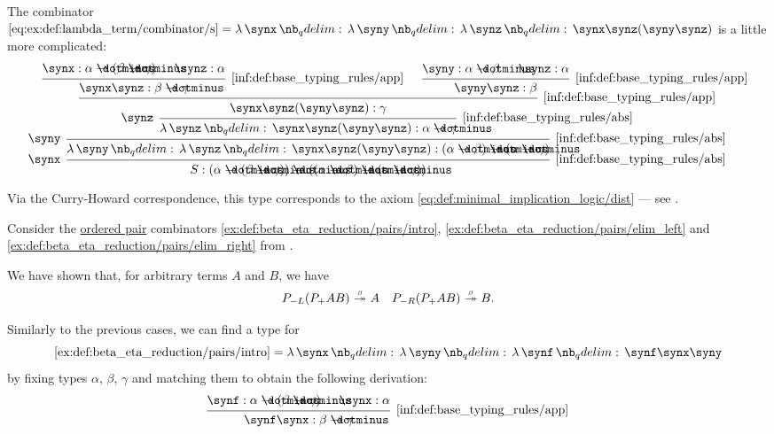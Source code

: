 \begin{example}
\begin{thmenum}
     The combinator \( \ref{eq:ex:def:lambda_term/combinator/s} = \qabs \synx \qabs \syny \qabs \synz \synx \synz (\syny \synz) \) is a little more complicated:
    \begin{equation*}
      \begin{prooftree}
        \hypo{ \synx: \alpha \synimplies (\beta \synimplies \gamma) }
        \hypo{ \synz: \alpha }
        \infer2[\ref{inf:def:base_typing_rules/app}]{ \synx \synz: \beta \synimplies \gamma }

        \hypo{ \syny: \alpha \synimplies \beta }
        \hypo{ \synz: \alpha }
        \infer2[\ref{inf:def:base_typing_rules/app}]{ \syny \synz: \beta }

        \infer2[\ref{inf:def:base_typing_rules/app}]{ \synx \synz (\syny \synz): \gamma }
        \infer[left label=\( \synz \)]1[\ref{inf:def:base_typing_rules/abs}]{ \qabs \synz \synx \synz (\syny \synz): \alpha \synimplies \gamma }
        \infer[left label=\( \syny \)]1[\ref{inf:def:base_typing_rules/abs}]{ \qabs \syny \qabs \synz \synx \synz (\syny \synz): (\alpha \synimplies \beta) \synimplies (\alpha \synimplies \gamma) }
        \infer[left label=\( \synx \)]1[\ref{inf:def:base_typing_rules/abs}]{ S: (\alpha \synimplies (\beta \synimplies \gamma)) \synimplies ((\alpha \synimplies \beta) \synimplies (\alpha \synimplies \gamma)) }
      \end{prooftree}
    \end{equation*}

    Via the Curry-Howard correspondence, this type corresponds to the axiom \eqref{eq:def:minimal_implication_logic/dist} --- see .

     Consider the \hyperref[def:ordered_tuple]{ordered pair} combinators \ref{ex:def:beta_eta_reduction/pairs/intro}, \ref{ex:def:beta_eta_reduction/pairs/elim_left} and \ref{ex:def:beta_eta_reduction/pairs/elim_right} from .

    We have shown that, for arbitrary terms \( A \) and \( B \), we have
    \begin{align*}
      P_{-L} (P_+ A B) \bred* A
      &&
      P_{-R} (P_+ A B) \bred* B.
    \end{align*}

    Similarly to the previous cases, we can find a type for
    \begin{equation*}
      \ref{ex:def:beta_eta_reduction/pairs/intro} = \qabs \synx \qabs \syny \qabs \synf \synf \synx \syny
    \end{equation*}
    by fixing types \( \alpha \), \( \beta \), \( \gamma \) and matching them to obtain the following derivation:
    \begin{equation*}
      \begin{prooftree}
        \hypo{ \synf: \alpha \synimplies (\beta \synimplies \gamma) }
        \hypo{ \synx: \alpha }
        \infer2[\ref{inf:def:base_typing_rules/app}]{ \synf \synx: \beta \synimplies \gamma }


\end{prooftree}
\end{equation*}
\end{thmenum}
\end{example}
